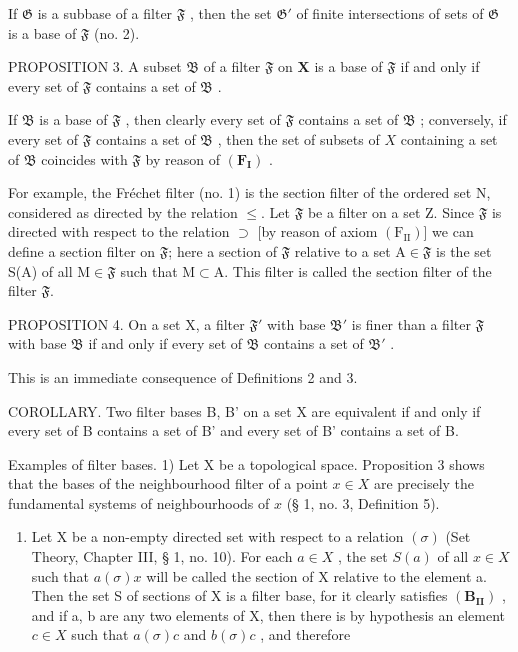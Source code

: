 If \(\mathfrak{G}\) is a subbase of a filter \(\mathfrak{F}\) , then the set \(\mathfrak{G}'\) of finite intersections of sets of \(\mathfrak{G}\) is a base of \(\mathfrak{F}\) (no. 2).

PROPOSITION 3. A subset \(\mathfrak{B}\) of a filter \(\mathfrak{F}\) on \(\mathbf{X}\) is a base of \(\mathfrak{F}\) if and only if every set of \(\mathfrak{F}\) contains a set of \(\mathfrak{B}\) .

If \(\mathfrak{B}\) is a base of \(\mathfrak{F}\) , then clearly every set of \(\mathfrak{F}\) contains a set of \(\mathfrak{B}\) ; conversely, if every set of \(\mathfrak{F}\) contains a set of \(\mathfrak{B}\) , then the set of subsets of \(X\) containing a set of \(\mathfrak{B}\) coincides with \(\mathfrak{F}\) by reason of \((\mathbf{F}_{\mathbf{I}})\) .

For example, the Fréchet filter (no. 1) is the section filter of the ordered set N, considered as directed by the relation \(\leqslant\). Let \(\mathfrak{F}\) be a filter on a set Z. Since \(\mathfrak{F}\) is directed with respect to the relation \(\supset\) {[}by reason of axiom \((\mathrm{F}_{\mathrm{II}})\){]} we can define a section filter on \(\mathfrak{F}\); here a section of \(\mathfrak{F}\) relative to a set A\(\in\mathfrak{F}\) is the set S(A) of all M\(\in\mathfrak{F}\) such that M\(\subset\)A. This filter is called the section filter of the filter \(\mathfrak{F}\).

PROPOSITION 4. On a set X, a filter \(\mathfrak{F}'\) with base \(\mathfrak{B}'\) is finer than a filter \(\mathfrak{F}\) with base \(\mathfrak{B}\) if and only if every set of \(\mathfrak{B}\) contains a set of \(\mathfrak{B}'\) .

This is an immediate consequence of Definitions 2 and 3.

COROLLARY. Two filter bases B, B' on a set X are equivalent if and only if every set of B contains a set of B' and every set of B' contains a set of B.

Examples of filter bases. 1) Let X be a topological space. Proposition 3 shows that the bases of the neighbourhood filter of a point \(x \in X\) are precisely the fundamental systems of neighbourhoods of \(x\) (§ 1, no. 3, Definition 5).

\begin{enumerate}
\def\labelenumi{\arabic{enumi})}
\setcounter{enumi}{1}
\tightlist
\item
  Let X be a non-empty directed set with respect to a relation \((\sigma)\) (Set Theory, Chapter III, § 1, no. 10). For each \(a \in X\) , the set \(S(a)\) of all \(x \in X\) such that \(a(\sigma)x\) will be called the section of X relative to the element a. Then the set S of sections of X is a filter base, for it clearly satisfies \((\mathbf{B}_{\mathbf{II}})\) , and if a, b are any two elements of X, then there is by hypothesis an element \(c \in X\) such that \(a(\sigma)c\) and \(b(\sigma)c\) , and therefore
\end{enumerate}

